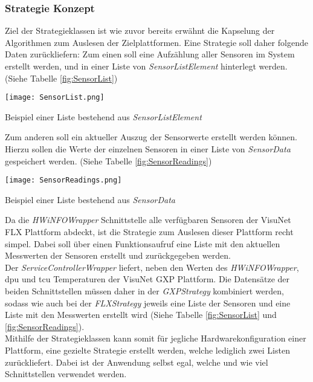 \subsubsection*{Strategie Konzept}
Ziel der Strategieklassen ist wie zuvor bereits erwähnt die Kapselung der Algorithmen zum Auslesen der Zielplattformen. Eine Strategie soll daher folgende Daten zurückliefern: Zum einen soll eine Aufzählung aller Sensoren im System erstellt werden, und in einer Liste von \textit{SensorListElement} hinterlegt werden. (Siehe Tabelle \ref{fig:SensorList}) 
\vspace{-0.5cm}
\begin{center}
    \begin{table}[h!]
        \centering
        \texttt{[image: SensorList.png]}
        \caption{Beispiel einer Liste bestehend aus \textit{SensorListElement}}
        \label{fig:SensorList}
    \end{table}
\end{center}
\vspace{-1.8cm}
Zum anderen soll ein aktueller Auszug der Sensorwerte erstellt werden können. Hierzu sollen die Werte der einzelnen Sensoren in einer Liste von \textit{SensorData} gespeichert werden. (Siehe Tabelle \ref{fig:SensorReadings})
\vspace{-0.5cm}
\begin{center}
    \begin{table}[h!]
        \centering
        \texttt{[image: SensorReadings.png]}
        \caption{Beispiel einer Liste bestehend aus \textit{SensorData}}
        \label{fig:SensorReadings}
    \end{table}
\end{center}
\vspace{-1.8cm}
Da die \textit{HWiNFOWrapper} Schnittstelle alle verfügbaren Sensoren der VisuNet FLX Plattform abdeckt, ist die Strategie zum Auslesen dieser Plattform recht simpel. Dabei soll über einen Funktionsaufruf eine Liste mit den aktuellen Messwerten der Sensoren erstellt und zurückgegeben werden.\\
Der \textit{ServiceControllerWrapper} liefert, neben den Werten des \textit{HWiNFOWrapper}, \ac{dpu} und \ac{tcu} Temperaturen der VisuNet GXP Plattform. Die Datensätze der beiden Schnittstellen müssen daher in der \textit{GXPStrategy} kombiniert werden, sodass wie auch bei der \textit{FLXStrategy} jeweils eine Liste der Sensoren und eine Liste mit den Messwerten erstellt wird (Siehe Tabelle \ref{fig:SensorList} und \ref{fig:SensorReadings}).\\
Mithilfe der Strategieklassen kann somit für jegliche Hardwarekonfiguration einer Plattform, eine gezielte Strategie erstellt werden, welche lediglich zwei Listen zurückliefert. Dabei ist der Anwendung selbst egal, welche und wie viel Schnittstellen verwendet werden.

